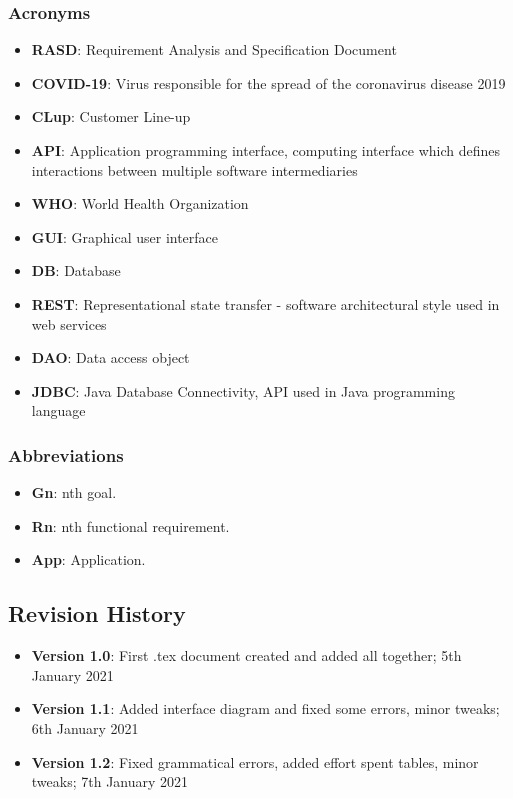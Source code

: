 \subsubsection{Acronyms}
\begin{itemize}
	\item \textbf{RASD}: Requirement Analysis and Specification Document
	\item \textbf{COVID-19}: Virus responsible for the spread of the coronavirus disease 2019
	\item \textbf{CLup}: Customer Line-up
	\item \textbf{API}: Application programming interface, computing interface which defines interactions between multiple software intermediaries 
	\item \textbf{WHO}: World Health Organization
	\item \textbf{GUI}: Graphical user interface
	\item \textbf{DB}: Database
	\item \textbf{REST}: Representational state transfer - software architectural style used in web services
	\item \textbf{DAO}: Data access object
	\item \textbf{JDBC}: Java Database Connectivity, API used in Java programming language
\end{itemize}
\subsubsection{Abbreviations}
\begin{itemize}
	\item \textbf{Gn}: nth goal.
	\item \textbf{Rn}: nth functional requirement.
	\item \textbf{App}: Application.
\end{itemize}

\newpage
\subsection{Revision History}
\begin{itemize}
	\item \textbf{Version 1.0}: First .tex document created and added all together; 5th January 2021
	\item \textbf{Version 1.1}: Added interface diagram and fixed some errors, minor tweaks; 6th January 2021
	\item \textbf{Version 1.2}: Fixed grammatical errors, added effort spent tables, minor tweaks; 7th January 2021
\end{itemize}


